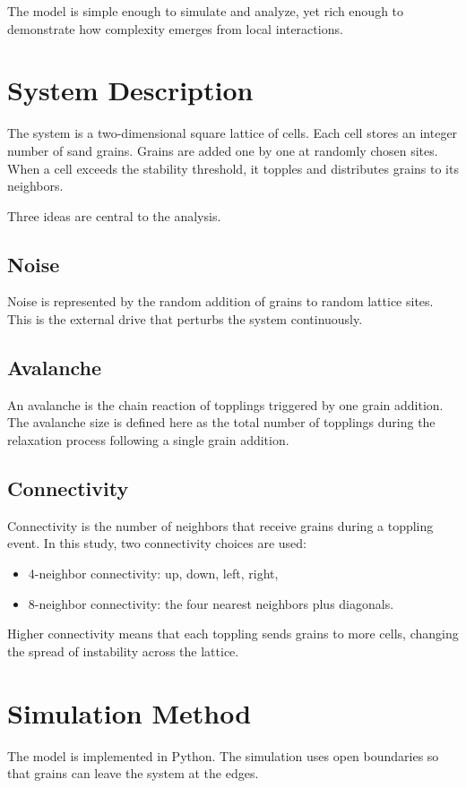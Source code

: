 \documentclass[12pt]{article}
\begin{document}
The model is simple enough to simulate and analyze, yet rich enough to demonstrate how complexity emerges from local interactions.

\section{System Description}
The system is a two-dimensional square lattice of cells. Each cell stores an integer number of sand grains. Grains are added one by one at randomly chosen sites. When a cell exceeds the stability threshold, it topples and distributes grains to its neighbors.

Three ideas are central to the analysis.

\subsection{Noise}
Noise is represented by the random addition of grains to random lattice sites. This is the external drive that perturbs the system continuously.

\subsection{Avalanche}
An avalanche is the chain reaction of topplings triggered by one grain addition. The avalanche size is defined here as the total number of topplings during the relaxation process following a single grain addition.

\subsection{Connectivity}
Connectivity is the number of neighbors that receive grains during a toppling event. In this study, two connectivity choices are used:
\begin{itemize}
    \item 4-neighbor connectivity: up, down, left, right,
    \item 8-neighbor connectivity: the four nearest neighbors plus diagonals.
\end{itemize}

Higher connectivity means that each toppling sends grains to more cells, changing the spread of instability across the lattice.

\section{Simulation Method}
The model is implemented in Python. The simulation uses open boundaries so that grains can leave the system at the edges.
\end{document}
